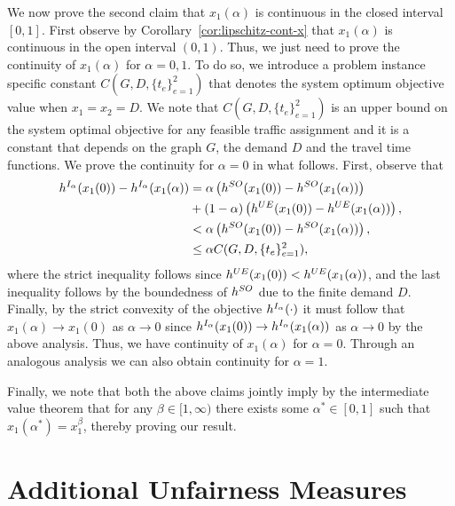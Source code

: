 \documentclass{article}
\begin{document}
We now prove the second claim that $x_1(\alpha)$ is continuous in the closed interval $[0, 1]$. First observe by Corollary~\ref{cor:lipschitz-cont-x} that $x_1(\alpha)$ is continuous in the open interval $(0, 1)$. Thus, we just need to prove the continuity of $x_1(\alpha)$ for $\alpha = 0, 1$. To do so, we introduce a problem instance specific constant $C(G, D, \{t_e\}_{e = 1}^2)$ that denotes the system optimum objective value when $x_1 = x_2 = D$. We note that $C(G, D, \{t_e\}_{e = 1}^2)$ is an upper bound on the system optimal objective for any feasible traffic assignment and it is a constant that depends on the graph $G$, the demand $D$ and the travel time functions. We prove the continuity for $\alpha = 0$ in what follows. First, observe that
\begin{align*}
    \objitap(x_1(0)) - \objitap(x_1(\alpha)) %
    &= \alpha \left( \objso(x_1(0)) - \objso(x_1(\alpha)) \right) \\&+ (1-\alpha) \left( \objue(x_1(0)) - \objue(x_1(\alpha)) \right), \\
    &< \alpha \left( \objso(x_1(0)) - \objso(x_1(\alpha)) \right), \\
    &\leq \alpha C(G, D, \{t_e\}_{e = 1}^2),
\end{align*}
where the strict inequality follows since $h^{UE}(x_1(0)) < h^{UE}(x_1(\alpha))$, and the last inequality follows by the boundedness of $h^{SO}$ due to the finite demand $D$. Finally, by the strict convexity of the objective $h^{I_{\alpha}}(\cdot)$ it must follow that $x_1(\alpha) \rightarrow x_1(0)$ as $\alpha \rightarrow 0$ since $h^{I_{\alpha}}(x_1(0)) \rightarrow h^{I_{\alpha}}(x_1(\alpha))$ as $\alpha \rightarrow 0$ by the above analysis. Thus, we have continuity of $x_1(\alpha)$ for $\alpha = 0$. Through an analogous analysis we can also obtain continuity for $\alpha = 1$.

Finally, we note that both the above claims jointly imply by the intermediate value theorem that for any $\beta \in [1, \infty)$ there exists some $\alpha^* \in [0, 1]$ such that $x_1(\alpha^*) = x_1^{\beta}$, thereby proving our result.


\section{Additional Unfairness Measures} \label{apdx:general-unfairness}
\end{document}
